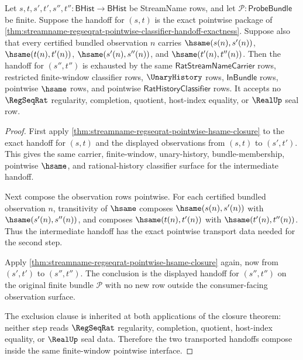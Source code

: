 \begin{theorem}
\label{thm:streamname-regseqrat-pointwise-hsame-transport-composition}
Let $s,t,s',t',s'',t'':\mathsf{BHist}\to\mathsf{BHist}$ be StreamName rows,
and let $\mathcal P:\mathsf{ProbeBundle}$ be finite. Suppose the handoff for
$(s,t)$ is the exact pointwise package of
\autoref{thm:streamname-regseqrat-pointwise-classifier-handoff-exactness}.
Suppose also that every certified bundled observation $n$ carries
$\hsame(s(n),s'(n))$, $\hsame(t(n),t'(n))$, $\hsame(s'(n),s''(n))$, and
$\hsame(t'(n),t''(n))$. Then the handoff for $(s'',t'')$ is exhausted by the
same $\mathsf{RatStreamNameCarrier}$ rows, restricted finite-window classifier
rows, $\UnaryHistory$ rows, $\mathsf{InBundle}$ rows, pointwise $\hsame$ rows,
and pointwise $\mathsf{RatHistoryClassifier}$ rows. It accepts no $\RegSeqRat$
regularity, completion, quotient, host-index equality, or $\RealUp$ seal row.
\end{theorem}
\begin{proof}
First apply
\autoref{thm:streamname-regseqrat-pointwise-hsame-closure} to the exact
handoff for $(s,t)$ and the displayed observations from $(s,t)$ to
$(s',t')$. This gives the same carrier, finite-window, unary-history,
bundle-membership, pointwise $\hsame$, and rational-history classifier surface
for the intermediate handoff.

Next compose the observation rows pointwise. For each certified bundled
observation $n$, transitivity of $\hsame$ composes
$\hsame(s(n),s'(n))$ with $\hsame(s'(n),s''(n))$, and composes
$\hsame(t(n),t'(n))$ with $\hsame(t'(n),t''(n))$. Thus the intermediate
handoff has the exact pointwise transport data needed for the second step.

Apply \autoref{thm:streamname-regseqrat-pointwise-hsame-closure} again, now
from $(s',t')$ to $(s'',t'')$. The conclusion is the displayed handoff for
$(s'',t'')$ on the original finite bundle $\mathcal P$ with no new row outside
the consumer-facing observation surface.

The exclusion clause is inherited at both applications of the closure theorem:
neither step reads $\RegSeqRat$ regularity, completion, quotient,
host-index equality, or $\RealUp$ seal data. Therefore the two transported
handoffs compose inside the same finite-window pointwise interface.
\end{proof}

